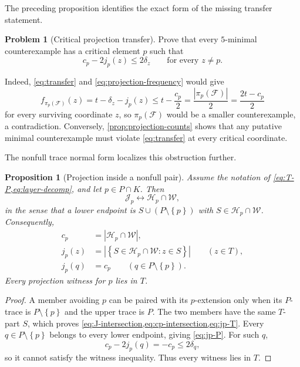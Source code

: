 \documentclass[11pt,reqno]{amsart}
\numberwithin{equation}{section}
\newtheorem{proposition}[proposition]{Proposition}
\theoremstyle{definition}
\newtheorem{problem}[problem]{Problem}
\theoremstyle{remark}
\newcommand{\F}{\mathcal{F}}
\newcommand{\Hh}{\mathcal{H}}
\newcommand{\W}{\mathcal{W}}
\newcommand{\J}{\mathcal{J}}
\newcommand{\1}{\mathbf{1}}
\newcommand{\set}[1]{\left\{#1\right\}}
\newcommand{\abs}[1]{\left|#1\right|}
\begin{document}
The preceding proposition identifies the exact form of the missing transfer statement.

\begin{problem}[Critical projection transfer]\label{prob:transfer}
Prove that every \(5\)-minimal counterexample has a critical element \(p\) such that
\begin{equation}\label{eq:transfer}
\boxed{
c_p-2j_p(z)\le2\delta_z
\qquad\text{for every }z\ne p.}
\end{equation}
\end{problem}

Indeed, \cref{eq:transfer} and \cref{eq:projection-frequency} would give
\[
f_{\pi_p(\F)}(z)
=t-\delta_z-j_p(z)
\le t-\frac{c_p}{2}
=\frac{\abs{\pi_p(\F)}}2
=\frac{2t-c_p}{2}
\]
for every surviving coordinate \(z\), so \(\pi_p(\F)\) would be a smaller counterexample, a contradiction.  Conversely, \cref{prop:projection-counts} shows that any putative minimal counterexample must violate \cref{eq:transfer} at every critical coordinate.

The nonfull trace normal form localizes this obstruction further.

\begin{proposition}[Projection inside a nonfull pair]\label{prop:projection-nonfull}
Assume the notation of \cref{eq:T-P,eq:layer-decomp}, and let \(p\in P\cap K\).  Then
\begin{equation}\label{eq:J-intersection}
\J_p\longleftrightarrow\Hh_p\cap\W,
\end{equation}
in the sense that a lower endpoint is
\(
S\cup(P\setminus\set{p})
\)
with \(S\in\Hh_p\cap\W\).  Consequently,
\begin{align}
 c_p&=\abs{\Hh_p\cap\W},
\label{eq:cp-intersection}\\
 j_p(z)&=\abs{\set{S\in\Hh_p\cap\W:z\in S}}
\qquad(z\in T),
\label{eq:jp-T}\\
 j_p(q)&=c_p
\qquad(q\in P\setminus\set{p}).
\label{eq:jp-P}
\end{align}
Every projection witness for \(p\) lies in \(T\).
\end{proposition}

\begin{proof}
A member avoiding \(p\) can be paired with its \(p\)-extension only when its \(P\)-trace is \(P\setminus\set{p}\) and the upper trace is \(P\).  The two members have the same \(T\)-part \(S\), which proves \cref{eq:J-intersection,eq:cp-intersection,eq:jp-T}.  Every \(q\in P\setminus\set{p}\) belongs to every lower endpoint, giving \cref{eq:jp-P}.  For such \(q\),
\[
c_p-2j_p(q)=-c_p\le2\delta_q,
\]
so it cannot satisfy the witness inequality.  Thus every witness lies in \(T\).
\end{proof}
\end{document}
